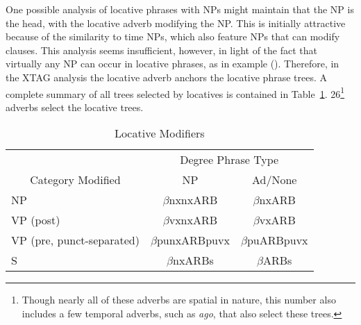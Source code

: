 One possible analysis of locative phrases with NPs might maintain that 
the NP is the head, with the locative adverb modifying the NP. This is 
initially attractive because of the similarity to time NPs, which also 
feature NPs that can modify clauses. This analysis seems insufficient, 
however, in light of the fact that virtually any NP can occur in 
locative phrases, as in example (). Therefore, in the XTAG analysis 
the locative adverb anchors the locative phrase trees. A complete summary 
of all trees selected by locatives is contained in Table~\ref{loc-summary}. 
26\footnote{Though nearly all of these adverbs are spatial in nature, 
this number also includes a few temporal adverbs, such as {\it ago}, 
that also select these trees.} adverbs select the locative trees.


\begin{table}[htb]
\centering
\begin{tabular}{|l||c|c|}
\hline
\multicolumn{1}{|c||}{}&
\multicolumn{2}{|c|}{Degree Phrase Type}\\
\cline{2-3}
\multicolumn{1}{|c||}{Category Modified}&NP&Ad/None\\
\hline
\hline
NP&$\beta$nxnxARB&$\beta$nxARB\\
\hline
VP (post)&$\beta$vxnxARB&$\beta$vxARB\\
\hline
VP (pre, punct-separated)&$\beta$punxARBpuvx&$\beta$puARBpuvx\\
\hline
S&$\beta$nxARBs&$\beta$ARBs\\
\hline
\end{tabular}
\caption{Locative Modifiers}
\label{loc-summary}
\end{table}






